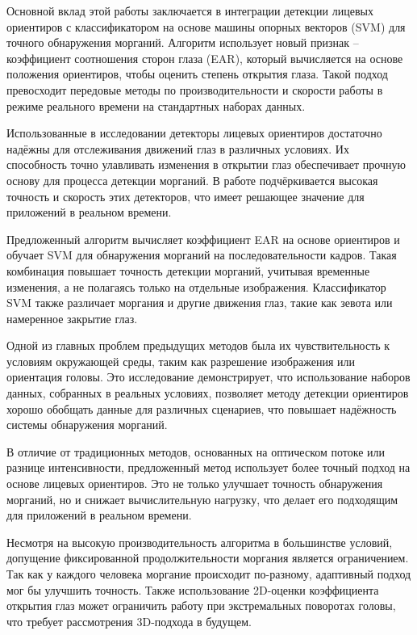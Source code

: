 \documentclass[
]{article}
\begin{document}
Основной вклад этой работы заключается в интеграции детекции лицевых
ориентиров с классификатором на основе машины опорных векторов (SVM) для
точного обнаружения морганий. Алгоритм использует новый признак --
коэффициент соотношения сторон глаза (EAR), который вычисляется на
основе положения ориентиров, чтобы оценить степень открытия глаза. Такой
подход превосходит передовые методы по производительности и скорости
работы в режиме реального времени на стандартных наборах данных.

Использованные в исследовании детекторы лицевых ориентиров достаточно
надёжны для отслеживания движений глаз в различных условиях. Их
способность точно улавливать изменения в открытии глаз обеспечивает
прочную основу для процесса детекции морганий. В работе подчёркивается
высокая точность и скорость этих детекторов, что имеет решающее значение
для приложений в реальном времени.

Предложенный алгоритм вычисляет коэффициент EAR на основе ориентиров и
обучает SVM для обнаружения морганий на последовательности кадров. Такая
комбинация повышает точность детекции морганий, учитывая временные
изменения, а не полагаясь только на отдельные изображения. Классификатор
SVM также различает моргания и другие движения глаз, такие как зевота
или намеренное закрытие глаз.

Одной из главных проблем предыдущих методов была их чувствительность к
условиям окружающей среды, таким как разрешение изображения или
ориентация головы. Это исследование демонстрирует, что использование
наборов данных, собранных в реальных условиях, позволяет методу детекции
ориентиров хорошо обобщать данные для различных сценариев, что повышает
надёжность системы обнаружения морганий.

В отличие от традиционных методов, основанных на оптическом потоке или
разнице интенсивности, предложенный метод использует более точный подход
на основе лицевых ориентиров. Это не только улучшает точность
обнаружения морганий, но и снижает вычислительную нагрузку, что делает
его подходящим для приложений в реальном времени.

Несмотря на высокую производительность алгоритма в большинстве условий,
допущение фиксированной продолжительности моргания является
ограничением. Так как у каждого человека моргание происходит по-разному,
адаптивный подход мог бы улучшить точность. Также использование
2D-оценки коэффициента открытия глаз может ограничить работу при
экстремальных поворотах головы, что требует рассмотрения 3D-подхода в
будущем.
\end{document}
